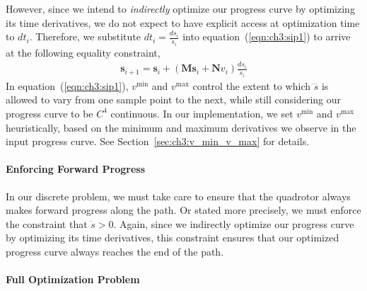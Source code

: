 However, since we intend to \emph{indirectly} optimize our progress curve by optimizing its time derivatives, we do not expect to have explicit access at optimization time to $dt_i$.
Therefore, we substitute $dt_i = \frac{ds_i}{\dot{s}_i}$ into equation~(\ref{eqn:ch3:sip1}) to arrive at the following equality constraint,
%
\begin{equation}
\begin{aligned}
\mathbf{s}_{i+1} = \mathbf{s}_{i} + (\mathbf{M}\mathbf{s}_{i} + \mathbf{N}v_{i}) \frac{ds_i}{\dot{s}_i}
\end{aligned}
\end{equation}
%
In equation~(\ref{eqn:ch3:sip1}), $v^{\text{min}}$ and $v^{\text{max}}$ control the extent to which $\ddddot{s}$ is allowed to vary from one sample point to the next, while still considering our progress curve to be $C^4$ continuous.
In our implementation, we set $v^{\text{min}}$ and $v^{\text{max}}$ heuristically, based on the minimum and maximum derivatives we observe in the input progress curve.
See Section~\ref{sec:ch3:v_min_v_max} for details.

\paragraph{Enforcing Forward Progress}
In our discrete problem, we must take care to ensure that the quadrotor always makes forward progress along the path.
Or stated more precisely, we must enforce the constraint that $\dot{s} > 0$.
Again, since we indirectly optimize our progress curve by optimizing its time derivatives, this constraint ensures that our optimized progress curve always reaches the end of the path.

\paragraph{Full Optimization Problem}

